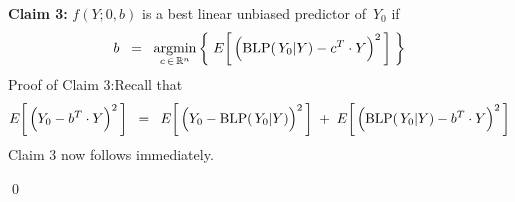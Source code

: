 \vskip 0.5cm
\noindent
\textbf{Claim 3:}\quad
$f(Y;0,b)$ is a best linear unbiased predictor of \,$Y_{0}$ if
\begin{equation*}
b \;\; = \;\;
	\underset{c\,\in\,\Re^{n}}{\textnormal{argmin}}
	\left\{\;E\!\left[\,\left(\blp(\,Y_{0}\vert Y) \overset{{\color{white}.}}{-} c^{T} \cdot Y\right)^{2}\,\right]\;\right\}
\end{equation*}
Proof of Claim 3:\quad Recall that
\begin{equation*}
E\!\left[\,\left(Y_{0} \overset{{\color{white}.}}{-} b^{T}\cdot Y\right)^{2}\,\right]
\;\; = \;\;
	E\!\left[\,\left(Y_{0} \overset{{\color{white}.}}{-} \blp(\,Y_{0}\vert Y)\right)^{2}\,\right]
	\; + \;
	E\!\left[\,\left(\blp(\,Y_{0}\vert Y) \overset{{\color{white}.}}{-} b^{T}\cdot Y\right)^{2}\,\right]
\end{equation*}
Claim 3 now follows immediately.

\qed


\renewcommand{\theenumi}{\roman{enumi}}
\renewcommand{\labelenumi}{\textnormal{(\theenumi)}$\;\;$}


